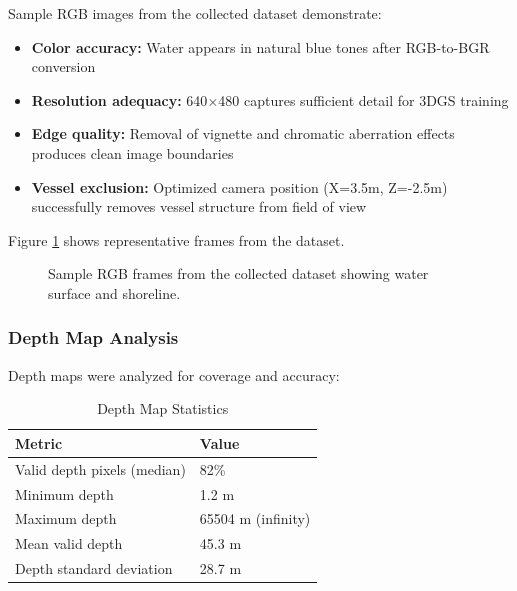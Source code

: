 Sample RGB images from the collected dataset demonstrate:

\begin{itemize}
    \item \textbf{Color accuracy:} Water appears in natural blue tones after RGB-to-BGR conversion
    \item \textbf{Resolution adequacy:} 640$\times$480 captures sufficient detail for 3DGS training
    \item \textbf{Edge quality:} Removal of vignette and chromatic aberration effects produces clean image boundaries
    \item \textbf{Vessel exclusion:} Optimized camera position (X=3.5m, Z=-2.5m) successfully removes vessel structure from field of view
\end{itemize}

Figure \ref{fig:sample_rgb} shows representative frames from the dataset.

\begin{figure}[htbp]
\centering
\hfill
{}
\caption{Sample RGB frames from the collected dataset showing water surface and shoreline.}
\label{fig:sample_rgb}
\end{figure}

\subsubsection{Depth Map Analysis}

Depth maps were analyzed for coverage and accuracy:

\begin{table}[htbp]
\centering
\caption{Depth Map Statistics}
\label{tab:depth_stats}
\begin{tabular}{@{}ll@{}}
\toprule
\textbf{Metric} & \textbf{Value} \\
\midrule
Valid depth pixels (median) & 82\% \\
Minimum depth & 1.2 m \\
Maximum depth & 65504 m (infinity) \\
Mean valid depth & 45.3 m \\
Depth standard deviation & 28.7 m \\
\bottomrule
\end{tabular}
\end{table}

